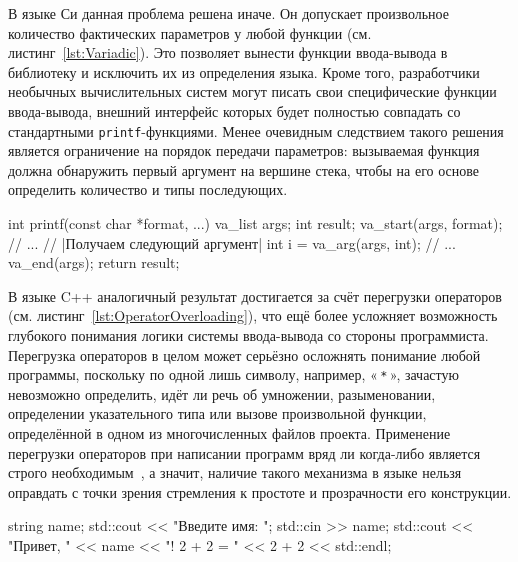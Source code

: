\documentclass[utf8]{lgu}
\newcommand{\code}[1]{{\normalsize\texttt{#1}}}
\begin{document}
В языке Си данная проблема решена иначе. Он допускает произвольное количество фактических параметров у любой функции (см. листинг~\ref{lst:Variadic}). Это позволяет вынести функции ввода-вывода в библиотеку и исключить их из определения языка. Кроме того, разработчики необычных вычислительных систем могут писать свои специфические функции ввода-вывода, внешний интерфейс которых будет полностью совпадать со стандартными \code{printf}-функциями. Менее очевидным следствием такого решения является ограничение на порядок передачи параметров: вызываемая функция должна обнаружить первый аргумент на вершине стека, чтобы на его основе определить количество и типы последующих.

\begin{listing}[H]
\caption{Произвольное количество параметров функций в языке Си}
\vspace{-17pt}
\label{lst:Variadic}
\begin{cc}
int printf(const char *format, ...) {
  va_list args;
  int result;
  va_start(args, format);
  // ...
  // |\textrussian{Получаем следующий аргумент}|
  int i = va_arg(args, int);
  // ...
  va_end(args);
  return result;
}
\end{cc}
\end{listing}

В языке C++ аналогичный результат достигается за счёт перегрузки операторов (см. листинг~\ref{lst:OperatorOverloading}), что ещё более усложняет возможность глубокого понимания логики системы ввода-вывода со стороны программиста. Перегрузка операторов в целом может серьёзно осложнять понимание любой программы, поскольку по одной лишь символу, например, «\,\code{*}\,», зачастую невозможно определить, идёт ли речь об умножении, разыменовании, определении указательного типа или вызове произвольной функции, определённой в одном из многочисленных файлов проекта. Применение перегрузки операторов при написании программ вряд ли когда-либо является строго необходимым~\cite{OperatorOverloading}, а значит, наличие такого механизма в языке нельзя оправдать с точки зрения стремления к простоте и прозрачности его конструкции.

\begin{listing}[H]
\caption{Перегрузка операций в языке C++}
\vspace{-17pt}
\label{lst:OperatorOverloading}
\begin{cc}
string name;
std::cout << "Введите имя: ";
std::cin >> name;
std::cout << "Привет, " << name
          << "! 2 + 2 = " << 2 + 2 << std::endl;
\end{cc}
\end{listing}
\end{document}
